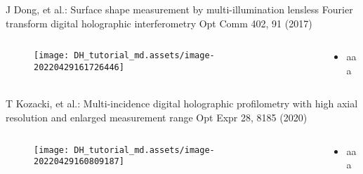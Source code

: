 \documentclass[t, aspectratio=169]{beamer}
\begin{document}
 
\begin{frame}{J Dong, et al.: Surface shape measurement by multi-illumination lensless Fourier transform digital holographic interferometry}
	\vspace{-3 mm}
	\small Opt Comm 402, 91 (2017)
	\begin{columns}
		\begin{column}{.6\textwidth}
			\begin{figure}
				\texttt{[image: DH\_tutorial\_md.assets/image-20220429161726446]}
			\end{figure}
		\end{column}
		\begin{column}{.4\textwidth}
			\begin{itemize}
				\item aaa
			\end{itemize}
		\end{column}
	\end{columns}
\end{frame}




\begin{frame}{T Kozacki, et al.: Multi-incidence digital holographic profilometry with high axial resolution and enlarged measurement range}
	\vspace{-3 mm}
	\small Opt Expr 28, 8185 (2020)
	\begin{columns}
		\begin{column}{.6\textwidth}
			\begin{figure}
				\texttt{[image: DH\_tutorial\_md.assets/image-20220429160809187]}
			\end{figure}
		\end{column}
		\begin{column}{.4\textwidth}
			\begin{itemize}
				\item aaa
			\end{itemize}
		\end{column}
	\end{columns}
\end{frame}
\end{document}
